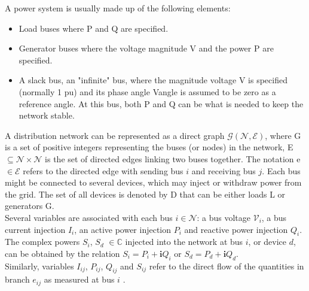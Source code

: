 \noindent A power system is usually made up of the following elements:
\begin{itemize}
    \item Load buses where \gls{P} and \gls{Q} are specified.
    \item Generator buses where the voltage magnitude \gls{V} and the power \gls{P} are specified.
    \item A slack bus, an "infinite" bus, where the magnitude voltage \gls{V} is specified (normally 1 \gls{pu}) and its phase angle \gls{Vangle} is assumed to be zero as a reference angle. At this bus, both \gls{P} and \gls{Q} can be what is needed to keep the network stable. \cite{eps}
\end{itemize}

A distribution network can be represented as a direct graph $\mathcal{G}(\mathcal{N},\mathcal{E})$, where \gls{G} is a set of positive integers representing the buses (or nodes) in the network, \gls{E} $\subseteq \mathcal{N} \times \mathcal{N}$ is the set of directed edges linking two buses together. The notation \gls{e} $\in \mathcal{E}$ refers to the directed edge with sending bus $i$ and receiving bus $j$. Each bus might be connected to several devices, which may inject or withdraw power from the grid. The set of all devices is denoted by \gls{D} that can be either loads \gls{L} or generators \gls{G}. \\
Several variables are associated with each bus $i \in \mathcal{N}$: a bus voltage $\mathcal{V}_i$, a bus current injection $I_i$, an active power injection $P_i$ and reactive power injection $Q_i$. The complex powers $S_i$, $S_d$ $\in \mathbb{C}$ injected into the network at bus $i$, or device $d$, can be obtained by the relation $S_i = P_i + \mathbf{i}Q_i$ or $S_d = P_d + \mathbf{i}Q_d$. \\
Similarly, variables $I_{ij}$, $P_{ij}$, $Q_{ij}$ and $S_{ij}$ refer to the direct flow of the quantities in branch $e_{ij}$ as measured at bus $i$ \cite{gym-anm}.

